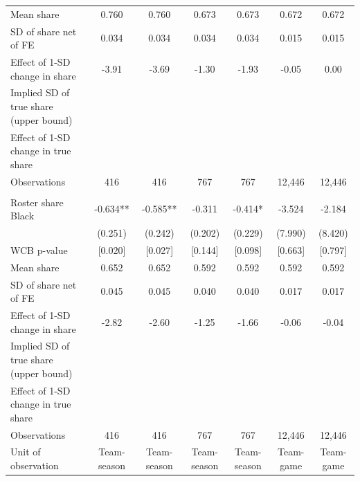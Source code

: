 \begin{table}[!h]
{\begin{threeparttable}
\begin{tabular}[t]{lcccccc}
\hspace{1em}Mean share & 0.760 & 0.760 & 0.673 & 0.673 & 0.672 & 0.672\\
\hspace{1em}SD of share net of FE & 0.034 & 0.034 & 0.034 & 0.034 & 0.015 & 0.015\\
\hspace{1em}Effect of 1-SD change in share & -3.91 & -3.69 & -1.30 & -1.93 & -0.05 & 0.00\\
\hspace{1em}Implied SD of true share (upper bound) &  &  &  &  &  \vphantom{1} & \\
\hspace{1em}Effect of 1-SD change in true share &  &  &  &  &  \vphantom{1} & \\
\hspace{1em}Observations & 416 & 416 & 767 & 767 & 12,446 & \vphantom{1} 12,446\\
\addlinespace[0.3em]
\multicolumn{7}{l}{\textbf{Panel F: Predicted race, raked to TIDES margins}}\\
\hspace{1em}Roster share Black & -0.634** & -0.585** & -0.311 & -0.414* & -3.524 & -2.184\\
\hspace{1em} & (0.251) & (0.242) & (0.202) & (0.229) & (7.990) & (8.420)\\
\hspace{1em}WCB p-value & {}[0.020] & {}[0.027] & {}[0.144] & {}[0.098] & {}[0.663] & {}[0.797]\\
\hspace{1em}Mean share & 0.652 & 0.652 & 0.592 & 0.592 & 0.592 & 0.592\\
\hspace{1em}SD of share net of FE & 0.045 & 0.045 & 0.040 & 0.040 & 0.017 & 0.017\\
\hspace{1em}Effect of 1-SD change in share & -2.82 & -2.60 & -1.25 & -1.66 & -0.06 & -0.04\\
\hspace{1em}Implied SD of true share (upper bound) &  &  &  &  &  & \\
\hspace{1em}Effect of 1-SD change in true share &  &  &  &  &  & \\
\hspace{1em}Observations & 416 & 416 & 767 & 767 & 12,446 & 12,446\\
\midrule
Unit of observation & Team-season & Team-season & Team-season & Team-season & Team-game & Team-game\\

\end{tabular}
\end{threeparttable}}
\end{table}
